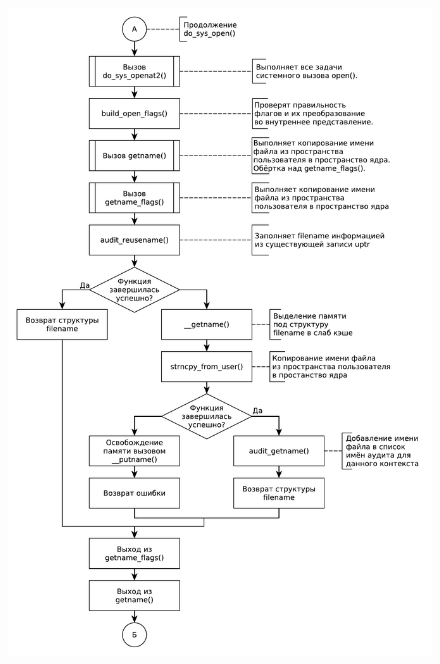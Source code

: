 \documentclass[a4paper,oneside,12pt]{extreport}
\begin{document}
\begin{figure}[H]
	\centering
	\includegraphics[scale=0.70]{inc/img/open2}
\end{figure}
\end{document}
